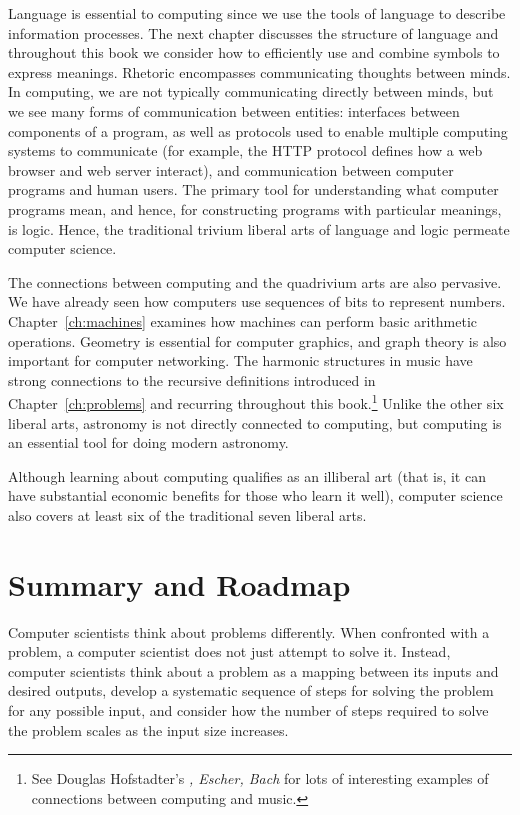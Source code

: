 Language is essential to computing since we use the tools of language to describe information processes.  The next chapter discusses the structure of language and throughout this book we consider how to efficiently use and combine symbols to express meanings.  Rhetoric encompasses communicating thoughts between minds.  In computing, we are not typically communicating directly between minds, but we see many forms of communication between entities: interfaces between components of a program, as well as protocols used to enable multiple computing systems to communicate (for example, the HTTP protocol defines how a web browser and web server interact), and communication between computer programs and human users.  The primary tool for understanding what computer programs mean, and hence, for constructing programs with particular meanings, is logic.  Hence, the traditional trivium liberal arts of language and logic permeate computer science.

The connections between computing and the quadrivium arts are also pervasive.  We have already seen how computers use sequences of bits to represent numbers.  Chapter~\ref{ch:machines} examines how machines can perform basic arithmetic operations.  Geometry is essential for computer graphics, and graph theory is also important for computer networking.  The harmonic structures in music have strong connections to the recursive definitions introduced in Chapter~\ref{ch:problems} and recurring throughout this book.\footnote{See Douglas Hofstadter's \emph{\Godel, Escher, Bach} for lots of interesting examples of connections between computing and music.}  Unlike the other six liberal arts, astronomy is not directly connected to computing, but computing is an essential tool for doing modern astronomy.

Although learning about computing qualifies as an illiberal art (that is, it can have substantial economic benefits for those who learn it well), computer science also covers at least six of the traditional seven liberal arts.

\section{Summary and Roadmap}\label{sec:roadmap}

Computer scientists think about problems differently.  When confronted with a problem, a computer scientist does not just attempt to solve it.  Instead, computer scientists think about a problem as a mapping between its inputs and desired outputs, develop a systematic sequence of steps for solving the problem for any possible input, and consider how the number of steps required to solve the problem scales as the input size increases.  

